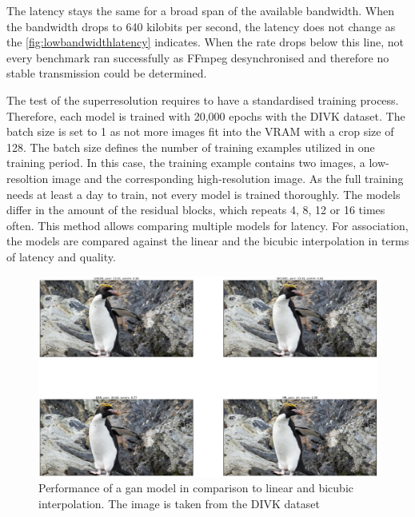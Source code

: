 \par
The latency stays the same for a broad span of the available bandwidth. When the bandwidth drops to 640 kilobits per second, the latency does not change as the \autoref{fig:lowbandwidthlatency} indicates. When the rate drops below this line, not every benchmark ran successfully as FFmpeg desynchronised and therefore no stable transmission could be determined.
\par 
The test of the superresolution requires to have a standardised training process. Therefore, each model is trained with 20,000 epochs with the DIVK dataset. The batch size is set to 1 as not more images fit into the VRAM with a crop size of 128. The batch size defines the number of training examples utilized in one training period. In this case, the training example contains two images, a low-resoltion image and the corresponding high-resolution image. As the full training needs at least a day to train, not every model is trained thoroughly. The models differ in the amount of the residual blocks, which repeats 4, 8, 12 or 16 times often. This method allows comparing multiple models for latency. For association, the models are compared against the linear and the bicubic interpolation in terms of latency and quality.

\begin{figure}[htbp]
    \includegraphics[width=\textwidth,height=\textheight,keepaspectratio]{logos/GANPerformance.png}
    \caption{Performance of a \gls{gan} model in comparison to linear and bicubic interpolation. The image is taken from the DIVK dataset \parencite{Agustsson2017}}
    \label{fig:ganperformance}
\end{figure}

